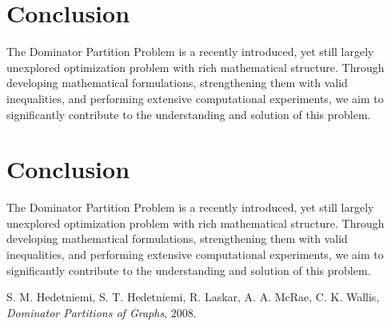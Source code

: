 \documentclass[12pt]{article}
\begin{document}
\section{Conclusion}
The Dominator Partition Problem is a recently introduced, yet still largely unexplored optimization problem with rich mathematical structure. Through developing mathematical formulations, strengthening them with valid inequalities, and performing extensive computational experiments, we aim to significantly contribute to the understanding and solution of this problem.


\section{Conclusion}
The Dominator Partition Problem is a recently introduced, yet still largely unexplored optimization problem with rich mathematical structure. Through developing mathematical formulations, strengthening them with valid inequalities, and performing extensive computational experiments, we aim to significantly contribute to the understanding and solution of this problem.


\clearpage

\begin{thebibliography}{9}

S. M. Hedetniemi, S. T. Hedetniemi, R. Laskar, A. A. McRae, C. K. Wallis,
\textit{Dominator Partitions of Graphs}, 2008.

\end{thebibliography}
\end{document}
